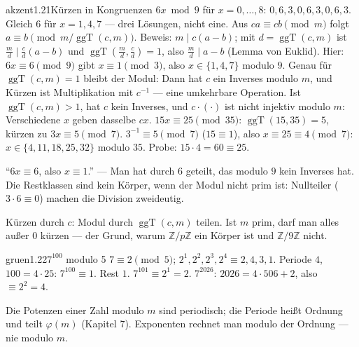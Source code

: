 \begin{loesungkarte}{akzent}{1.21}{Kürzen in Kongruenzen}
$6x\bmod9$ für $x = 0, \dots, 8$: $0, 6, 3, 0, 6, 3, 0, 6, 3$. Gleich $6$ für $x = 1, 4, 7$ --- drei Lösungen, nicht eine.
Aus $ca\equiv cb\pmod m$ folgt $a\equiv b\pmod{m/\operatorname{ggT}(c, m)}$. Beweis: $m\mid c(a - b)$; mit $d = \operatorname{ggT}(c, m)$ ist $\frac md\mid\frac cd(a - b)$ und $\operatorname{ggT}(\frac md, \frac cd) = 1$, also $\frac md\mid a - b$ (Lemma von Euklid). Hier: $6x\equiv6\pmod9$ gibt $x\equiv1\pmod3$, also $x\in\{1, 4, 7\}$ modulo $9$. \checkmark
{}
Genau für $\operatorname{ggT}(c, m) = 1$ bleibt der Modul: Dann hat $c$ ein Inverses modulo $m$, und Kürzen ist Multiplikation mit $c^{-1}$ --- eine umkehrbare Operation. Ist $\operatorname{ggT}(c, m) > 1$, hat $c$ kein Inverses, und $c\cdot(\cdot)$ ist nicht injektiv modulo $m$: Verschiedene $x$ geben dasselbe $cx$.
$15x\equiv25\pmod{35}$: $\operatorname{ggT}(15, 35) = 5$, kürzen zu $3x\equiv5\pmod7$. $3^{-1}\equiv5\pmod7$ ($15\equiv1$), also $x\equiv25\equiv4\pmod7$: $x\in\{4, 11, 18, 25, 32\}$ modulo $35$. Probe: $15\cdot4 = 60\equiv25$. \checkmark
\begin{fehler}\kastentext
\enquote{$6x\equiv6$, also $x\equiv1$.} --- Man hat durch $6$ geteilt, das modulo $9$ kein Inverses hat. Die Restklassen sind kein Körper, wenn der Modul nicht prim ist: Nullteiler ($3\cdot6\equiv0$) machen die Division zweideutig.
\end{fehler}
\begin{mitnehmen}\kastentext
Kürzen durch $c$: Modul durch $\operatorname{ggT}(c, m)$ teilen. Ist $m$ prim, darf man alles außer $0$ kürzen --- der Grund, warum $\mathbb Z/p\mathbb Z$ ein Körper ist und $\mathbb Z/9\mathbb Z$ nicht.
\end{mitnehmen}
\end{loesungkarte}

\begin{loesungkarte}{gruen}{1.22}{$7^{100}$ modulo 5}
$7\equiv2\pmod5$; $2^{1}, 2^{2}, 2^{3}, 2^{4}\equiv2, 4, 3, 1$. Periode $4$, $100 = 4\cdot25$: $7^{100}\equiv1$. Rest $1$.
$7^{101}\equiv2^{1} = 2$. $7^{2026}$: $2026 = 4\cdot506 + 2$, also $\equiv2^{2} = 4$.
\begin{mitnehmen}\kastentext
Die Potenzen einer Zahl modulo $m$ sind periodisch; die Periode heißt Ordnung und teilt $\varphi(m)$ (Kapitel 7). Exponenten rechnet man modulo der Ordnung --- nie modulo $m$.
\end{mitnehmen}
\end{loesungkarte}

